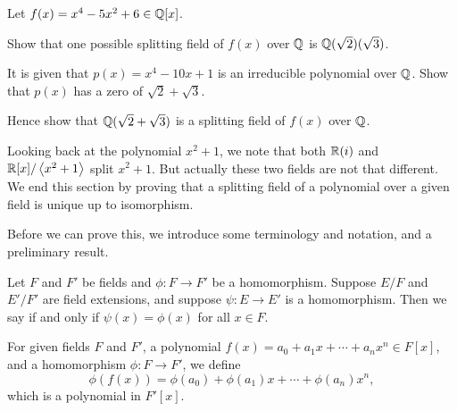 \begin{exercise}\label{exercise-splitting-field-sqrt2-sqrt3}
    Let $f(x) = x^4 - 5x^2 + 6 \in \mathbb{Q}[x]$.
    \begin{partquestions}{\roman*}
        \item Show that one possible splitting field of $f(x)$ over $\mathbb{Q}$ is $\mathbb{Q}(\sqrt2)(\sqrt3)$.
        \item It is given that $p(x) = x^4 - 10x + 1$ is an irreducible polynomial over $\mathbb{Q}$. Show that $p(x)$ has a zero of $\sqrt2 + \sqrt3$.
        \item Hence show that $\mathbb{Q}(\sqrt2 + \sqrt3)$ is a splitting field of $f(x)$ over $\mathbb{Q}$.
    \end{partquestions}
\end{exercise}

Looking back at the polynomial $x^2+1$, we note that both $\mathbb{R}(i)$ and $\mathbb{R}[x]/\left\langle x^2+1\right\rangle$ split $x^2+1$. But actually these two fields are not that different. We end this section by proving that a splitting field of a polynomial over a given field is unique up to isomorphism.

Before we can prove this, we introduce some terminology and notation, and a preliminary result.

\begin{definition}
    Let $F$ and $F'$ be fields and $\phi: F \to F'$ be a homomorphism. Suppose $E/F$ and $E'/F'$ are field extensions, and suppose $\psi: E \to E'$ is a homomorphism. Then we say  if and only if $\psi(x) = \phi(x)$ for all $x \in F$.
\end{definition}

\begin{definition}
    For given fields $F$ and $F'$, a polynomial $f(x) = a_0 + a_1x + \cdots + a_nx^n \in F[x]$, and a homomorphism $\phi: F \to F'$, we define
    \[
        \phi(f(x)) = \phi(a_0) + \phi(a_1)x + \cdots + \phi(a_n)x^n,
    \]
    which is a polynomial in $F'[x]$.
\end{definition}



